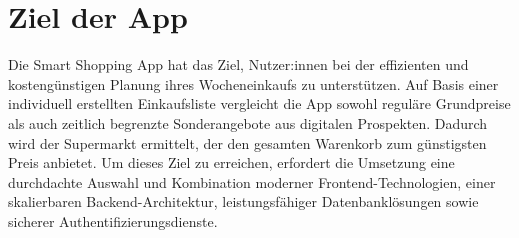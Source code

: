 \section{Ziel der App}
Die Smart Shopping App hat das Ziel, Nutzer:innen bei der effizienten und kostengünstigen Planung ihres Wocheneinkaufs zu unterstützen. Auf Basis einer individuell erstellten Einkaufsliste vergleicht die App sowohl reguläre Grundpreise als auch zeitlich begrenzte Sonderangebote aus digitalen Prospekten. Dadurch wird der Supermarkt ermittelt, der den gesamten Warenkorb zum günstigsten Preis anbietet. Um dieses Ziel zu erreichen, erfordert die Umsetzung eine durchdachte Auswahl und Kombination moderner Frontend-Technologien, einer skalierbaren Backend-Architektur, leistungsfähiger Datenbanklösungen sowie sicherer Authentifizierungsdienste. 